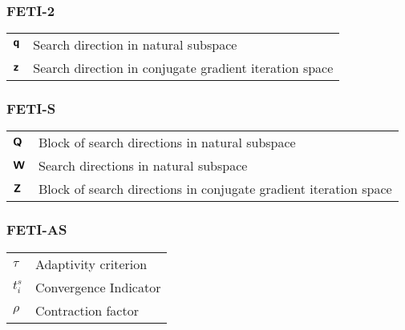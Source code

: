 \subsubsection*{FETI-2}
\begin{tabular}{l l}
$\boldsymbol{ \mathsf{q} }$ & Search direction in natural subspace\\
$\boldsymbol{ \mathsf{z} }$ & Search direction in conjugate gradient iteration space\\
\end{tabular}
\subsubsection*{FETI-S}
\begin{tabular}{l l}
$\boldsymbol{\mathsf{Q}}$ & Block of search directions in natural subspace\\
$\boldsymbol{\mathsf{W}}$ & Search directions in natural subspace\\
$\boldsymbol{\mathsf{Z}}$ & Block of search directions in conjugate gradient iteration space\\
\end{tabular}

\subsubsection*{FETI-AS}
\begin{tabular}{l l}
$\tau$ & Adaptivity criterion\\
$t_i^s$ & Convergence Indicator\\
$\rho$ & Contraction factor\\
\end{tabular}


